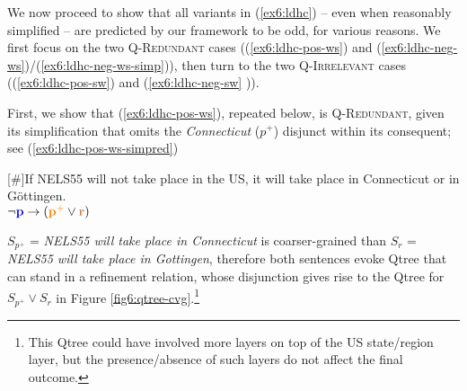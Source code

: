 \begin{exe}
	\ex 
	\begin{xlist}
		\label{ex6:ldhc-neg-ws-simp}
		\label{ex6:ldhc-neg-sw-simp}
	\end{xlist}
\end{exe}



We now proceed to show that all variants in (\ref{ex6:ldhc}) -- even when reasonably simplified -- are predicted by our framework to be odd, for various reasons. We first focus on the two \textsc{Q-Redundant} cases ((\ref{ex6:ldhc-pos-ws}) and (\ref{ex6:ldhc-neg-ws})/(\ref{ex6:ldhc-neg-ws-simp})), then turn to the two \textsc{Q-Irrelevant} cases ((\ref{ex6:ldhc-pos-sw}) and (\ref{ex6:ldhc-neg-sw}	)).

First, we show that (\ref{ex6:ldhc-pos-ws}), repeated below, is \textsc{Q-Redundant}, given its simplification that omits the \textit{Connecticut} ($p^+$) disjunct within its consequent; see (\ref{ex6:ldhc-pos-ws-simpred})

\begin{exe}
	[\#]{If NELS55 will not take place in the US, it will take place in Connecticut or in Göttingen.
		\\ $\neg\textbf{\textcolor{blue}{p}} \rightarrow (\textbf{\textcolor{orange}{p$^+$}}\vee\textbf{\textcolor{brown}{r}})$}
	\label{ex6:ldhc-pos-ws-simpred}
\end{exe}

$S_{p^+}$ = \textit{NELS55 will take place in Connecticut} is coarser-grained than $S_{r}$ = \textit{NELS55 will take place in Gottingen}, therefore both sentences evoke Qtree that can stand in a refinement relation, whose disjunction gives rise to the Qtree for $S_{p^+} \vee S_r$ in Figure \ref{fig6:qtree-cvg}.\footnote{This Qtree could have involved more layers on top of the US state/region layer, but the presence/absence of such layers do not affect the final outcome.} 

